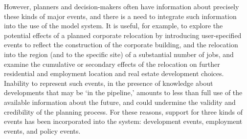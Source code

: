 However, planners and decision-makers often have information about
precisely these kinds of major events, and there is a need to
integrate such information into the use of the model system.  It
is useful, for example, to explore the potential effects of a
planned corporate relocation by introducing user-specified events
to reflect the construction of the corporate building, and the
relocation into the region (and to the specific site) of a
substantial number of jobs, and examine the cumulative or
secondary effects of the relocation on further residential and
employment location and real estate development choices. Inability
to represent such events, in the presence of knowledge about
developments that may be `in the pipeline,' amounts to less than
full use of the available information about the future, and could
undermine the validity and credibility of the planning process.
For these reasons, support for three kinds of events has been
incorporated into the system: development events, employment
events, and policy events.



